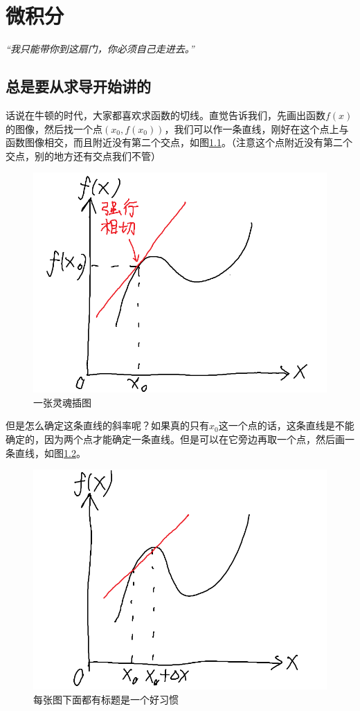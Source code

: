 \chapter{微积分}
\centerline{\it “我只能带你到这扇门，你必须自己走进去。”}
\section{总是要从求导开始讲的}
话说在牛顿的时代，大家都喜欢求函数的切线。直觉告诉我们，先画出函数$f(x)$的图像，然后找一个点$(x_0,f(x_0))$，我们可以作一条直线，刚好在这个点上与函数图像相交，而且附近没有第二个交点，如图\ref{fig-tangent}。（注意这个点附近没有第二个交点，别的地方还有交点我们不管）
\begin{figure}[htb]
\centering
\includegraphics[scale=0.5]{fig/tangent.png}
\caption{一张灵魂插图}
\label{fig-tangent}
\end{figure}

但是怎么确定这条直线的斜率呢？如果真的只有$x_0$这一个点的话，这条直线是不能确定的，因为两个点才能确定一条直线。但是可以在它旁边再取一个点，然后画一条直线，如图\ref{fig-secant}。
\begin{figure}[htb]
\centering
\includegraphics[scale=0.5]{fig/secant.png}
\caption{每张图下面都有标题是一个好习惯}
\label{fig-secant}
\end{figure}

